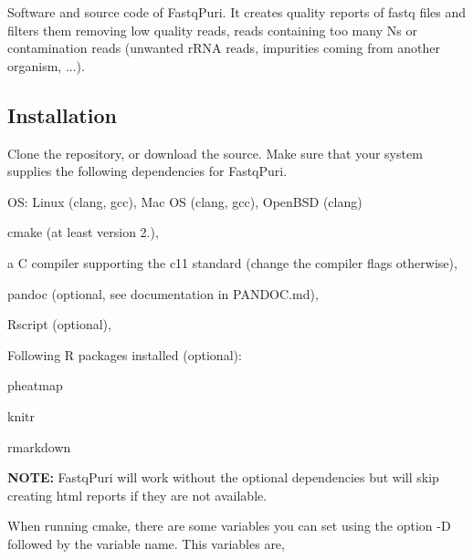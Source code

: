 Software and source code of {\ttfamily Fastq\+Puri}. It creates quality reports of {\ttfamily fastq} files and filters them removing low quality reads, reads containing too many N\textquotesingle{}s or contamination reads (unwanted r\+R\+NA reads, impurities coming from another organism, ...).

\subsection*{Installation}

Clone the repository, or download the source. Make sure that your system supplies the following dependencies for Fastq\+Puri.


\begin{DoxyItemize}
\item OS\+: Linux (clang, gcc), Mac OS (clang, gcc), Open\+B\+SD (clang)
\item {\ttfamily cmake} (at least version 2.),
\item a {\ttfamily C} compiler supporting the {\ttfamily c11} standard (change the compiler flags otherwise),
\item pandoc (optional, see documentation in {\ttfamily P\+A\+N\+D\+O\+C.\+md}),
\item {\ttfamily Rscript} (optional),
\item Following {\ttfamily R} packages installed (optional)\+:
\begin{DoxyItemize}
\item {\ttfamily pheatmap}
\item {\ttfamily knitr}
\item {\ttfamily rmarkdown}
\end{DoxyItemize}
\end{DoxyItemize}

{\bfseries N\+O\+TE\+:} Fastq\+Puri will work without the optional dependencies but will skip creating html reports if they are not available.




When running cmake, there are some variables you can set using the option -\/D followed by the variable name. This variables are,



